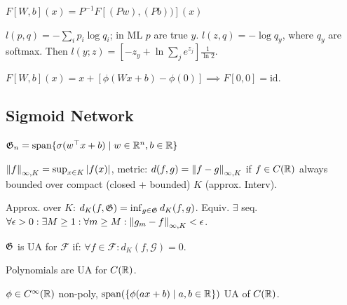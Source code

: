 \begin{definition}
    \(F[W, b](x) = P^{-1} F[(Pw), (Pb))](x)\)
\end{definition}

\begin{definition}
    \(l(p, q) = - \sum_i p_i \log q_i\); in ML \(p\) are true \(y\). \(l(z, q) = - \log q_y\), where \(q_y\) are softmax. Then \(l(y; z) = [- z_y + \ln \sum_j e^{z_j}] \frac{1}{\ln 2}\).
\end{definition}

\begin{definition}[Residual]
    \(F[W, b](x) = x + [\phi(Wx + b) - \phi(0)] \implies F[0, 0] = \text{id}\).
\end{definition}

\subsection{Sigmoid Network}

\begin{definition}
    \(\mathfrak{G}_n = \text{span}\{\sigma(w^\top x + b) \mid w \in \mathbb{R}^n, b \in \mathbb{R}\}\)
\end{definition}

\begin{definition}
    \(\norm{f}_{\infty, K} = \sup_{x \in K} |f(x)|\), metric: \(d(f, g) = \norm{f - g}_{\infty, K}\)
    if \(f \in C(\mathbb{R})\) always bounded over compact (closed + bounded) \(K\) (approx. Interv).
\end{definition}

\begin{definition}
    Approx. over \(K\): \(d_K(f, \mathfrak{G}) = \inf_{g \in \mathfrak{G}} d_K(f, g)\). Equiv. \(\exists\) seq. \(\forall \epsilon > 0: \exists M \geq 1: \forall m \geq M: \norm{g_m - f}_{\infty, K} < \epsilon\).
\end{definition}

\begin{definition}
    \(\mathfrak{G}\) is UA for \(\mathcal{F}\) if: \(\forall f \in \mathcal F: d_K(f, \mathcal G) = 0\).
\end{definition}

\begin{theorem}[Weierstrass]
    Polynomials are UA for \(C(\mathbb{R})\).
\end{theorem}

\begin{theorem}
    \(\phi \in C^\infty(\mathbb{R})\) non-poly, \(\text{span}(\{\phi(ax + b) \mid a, b \in \mathbb{R}\})\) UA of \(C(\mathbb{R})\).
\end{theorem}

